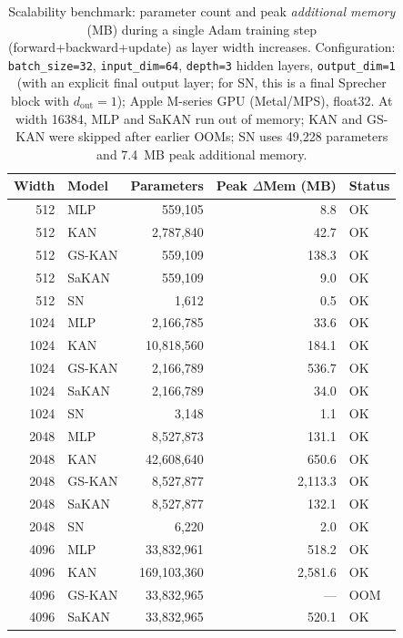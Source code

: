 \documentclass{article}
\theoremstyle{plain}
\theoremstyle{definition}
\theoremstyle{remark}
\begin{document}
\begin{table}[ht]
\centering
\small
\caption{Scalability benchmark: parameter count and peak \emph{additional memory} (MB) during a single Adam training step (forward+backward+update) as layer width increases. Configuration: \texttt{batch\_size=32}, \texttt{input\_dim=64}, \texttt{depth=3} hidden layers, \texttt{output\_dim=1} (with an explicit final output layer; for SN, this is a final Sprecher block with $d_{\mathrm{out}}=1$); Apple M-series GPU (Metal/MPS), float32. At width 16384, MLP and SaKAN run out of memory; KAN and GS-KAN were skipped after earlier OOMs; SN uses 49,228 parameters and 7.4~MB peak additional memory.}
\label{tab:scalability}
\begin{tabular}{r l r r l}
\toprule
Width & Model & Parameters & Peak $\Delta$Mem (MB) & Status \\
\midrule
512   & MLP       & 559,105       & 8.8     & OK \\
512   & KAN       & 2,787,840     & 42.7    & OK \\
512   & GS-KAN    & 559,109       & 138.3   & OK \\
512   & SaKAN     & 559,109       & 9.0     & OK \\
512   & SN        & 1,612         & 0.5     & OK \\
\midrule
1024  & MLP       & 2,166,785     & 33.6    & OK \\
1024  & KAN       & 10,818,560    & 184.1   & OK \\
1024  & GS-KAN    & 2,166,789     & 536.7   & OK \\
1024  & SaKAN     & 2,166,789     & 34.0    & OK \\
1024  & SN        & 3,148         & 1.1     & OK \\
\midrule
2048  & MLP       & 8,527,873     & 131.1   & OK \\
2048  & KAN       & 42,608,640    & 650.6   & OK \\
2048  & GS-KAN    & 8,527,877     & 2,113.3 & OK \\
2048  & SaKAN     & 8,527,877     & 132.1   & OK \\
2048  & SN        & 6,220         & 2.0     & OK \\
\midrule
4096  & MLP       & 33,832,961    & 518.2   & OK \\
4096  & KAN       & 169,103,360   & 2,581.6 & OK \\
4096  & GS-KAN    & 33,832,965    & ---     & OOM \\
4096  & SaKAN     & 33,832,965    & 520.1   & OK \\

\end{tabular}
\end{table}
\end{document}
